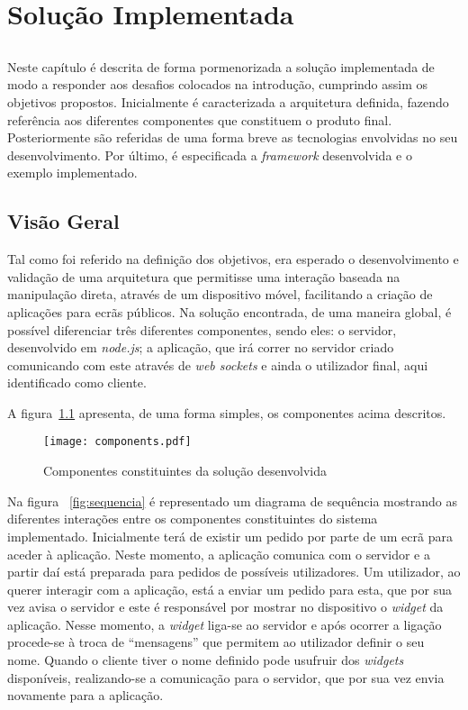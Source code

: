 \chapter{Solução Implementada} \label{chap:sol}

\section*{}

Neste capítulo é descrita de forma pormenorizada a solução implementada de modo a responder aos desafios colocados na introdução, cumprindo assim os objetivos propostos.
Inicialmente é caracterizada a arquitetura definida, fazendo referência aos diferentes componentes que constituem o produto final. Posteriormente são referidas de uma forma breve as tecnologias envolvidas no seu desenvolvimento.
Por último, é especificada a \textit{framework} desenvolvida e o exemplo implementado.

\section{Visão Geral} \label{sec:geral}

Tal como foi referido na definição dos objetivos, era esperado o desenvolvimento e validação de uma arquitetura que permitisse uma interação baseada na manipulação direta, através de um dispositivo móvel, facilitando a criação de aplicações para ecrãs públicos.
Na solução encontrada, de uma maneira global, é possível diferenciar três diferentes componentes, sendo eles: o servidor, desenvolvido em \textit{node.js}; a aplicação, que irá correr no servidor criado comunicando com este através de \textit{web sockets} e ainda o utilizador final, aqui identificado como cliente.

A figura~\ref{fig:componentes} apresenta, de uma forma simples, os componentes acima descritos.

\begin{figure}[ht]
\centering
\texttt{[image: components.pdf]}
\caption[Componentes] {Componentes constituintes da solução desenvolvida}
\label{fig:componentes}
\end{figure}

Na figura ~\ref{fig:sequencia} é representado um diagrama de sequência mostrando as diferentes interações entre os componentes constituintes do sistema implementado. Inicialmente terá de existir um pedido por parte de um ecrã para aceder à aplicação. Neste momento, a aplicação comunica com o servidor e a partir daí está preparada para pedidos de possíveis utilizadores. Um utilizador, ao querer interagir com a aplicação, está a enviar um pedido para esta, que por sua vez avisa o servidor e este é responsável por mostrar no dispositivo o \textit{widget} da aplicação. Nesse momento, a \textit{widget} liga-se ao servidor e após ocorrer a ligação procede-se à troca de ``mensagens'' que permitem ao utilizador definir o seu nome. Quando o cliente tiver o nome definido pode usufruir dos \textit{widgets} disponíveis, realizando-se a comunicação para o servidor, que por sua vez envia novamente para a aplicação.

